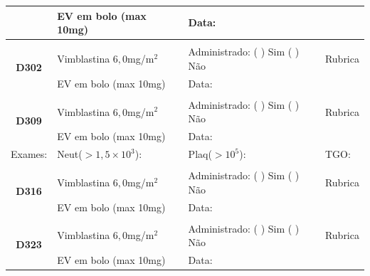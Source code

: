 \documentclass[11pt,a4paper,oldfontcommands]{memoir}
\begin{document}
\begin{center}
\begin{table}[H]
\begin{tabular}{p{}p{}|p{}|p{3cm}}
    \multicolumn{1}{c|}{}&{EV em bolo (max 10mg)}&{Data:}&\\
    \hline
    \\
    \hline
    \multicolumn{1}{c|}{\multirow{2}{*}{\textbf{D302}}}&{Vimblastina \(6,0\)mg/m\(^2\)}&{Administrado: (  ) Sim (  ) Não}&{Rubrica}\\
    \multicolumn{1}{c|}{}&{EV em bolo (max 10mg)}&{Data:}&\\
    \hline
    \\
    \hline
    \multicolumn{1}{c|}{\multirow{2}{*}{\textbf{D309}}}&{Vimblastina \(6,0\)mg/m\(^2\)}&{Administrado: (  ) Sim (  ) Não}&{Rubrica}\\
    \multicolumn{1}{c|}{}&{EV em bolo (max 10mg)}&{Data:}&\\
    \hline
    {Exames:}&{Neut(\(>1,5\times10^3\)):}&{Plaq(\(>10^5\)):}&{TGO:}
    \\
    \hline
    \\
    \hline
    \multicolumn{1}{c|}{\multirow{2}{*}{\textbf{D316}}}&{Vimblastina \(6,0\)mg/m\(^2\)}&{Administrado: (  ) Sim (  ) Não}&{Rubrica}\\
    \multicolumn{1}{c|}{}&{EV em bolo (max 10mg)}&{Data:}&\\
    \hline
   \\
    \hline
    \multicolumn{1}{c|}{\multirow{2}{*}{\textbf{D323}}}&{Vimblastina \(6,0\)mg/m\(^2\)}&{Administrado: (  ) Sim (  ) Não}&{Rubrica}\\
    \multicolumn{1}{c|}{}&{EV em bolo (max 10mg)}&{Data:}&\\
    \hline


\end{tabular}
\end{table}
\end{center}
\end{document}
